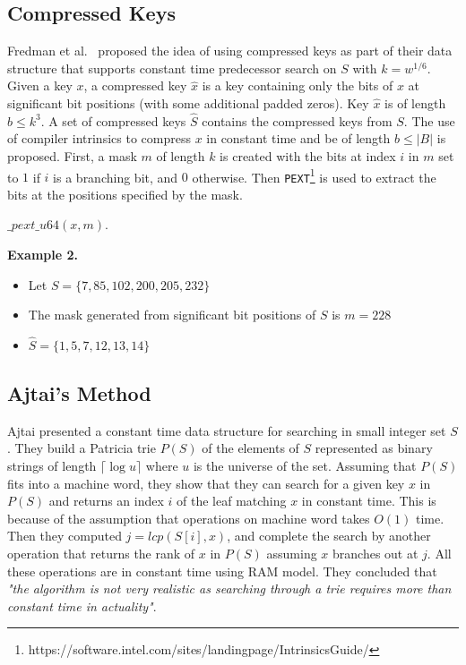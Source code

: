 \subsection{Compressed Keys} Fredman et al.~\cite{FREDMAN1993424} proposed the idea of using compressed keys as part of their data structure that supports constant time predecessor search on $S$ with $k = w^{1/6}$. Given a key $x$, a compressed key $\hat{x}$ is a key containing only the bits of $x$ at significant bit positions (with some additional padded zeros). Key $\hat{x}$ is of length $b \leq k^3$. A set of compressed keys $\hat{S}$ contains the compressed keys from $S$. The use of compiler intrinsics to compress $x$ in constant time and be of length $b \leq |B|$ is proposed. First, a mask $m$ of length $k$ is created with the bits at index $i$ in $m$ set to $1$ if $i$ is a branching bit, and $0$ otherwise. Then \texttt{PEXT}\footnote{https://software.intel.com/sites/landingpage/IntrinsicsGuide/} is used to extract the bits at the positions specified by the mask.\par
\begin{table}[ht]
    \centering
    \begin{minipage}[t]{1\textwidth}
        \centering
        \begin{algorithm}[H]
            \caption{Compress(x, m)}
            \begin{algorithmic}[1]
                \RETURN \textit{$\_pext\_u64(x, m)$}.
            \end{algorithmic}
        \end{algorithm}
    \end{minipage}%
\end{table}

\textbf{Example 2.}
\begin{itemize}
    \item Let $S = \{ 7, 85, 102, 200, 205, 232 \} $
    \item The mask generated from significant bit positions of $S$ is $m = 228$
    \item $\hat{S} = \{ 1, 5, 7, 12, 13, 14 \}$
\end{itemize}

\subsection{Ajtai's Method}
Ajtai \cite{AJTAI1984217} presented a constant time data structure for searching in small integer set $S$. They build a Patricia trie $P(S)$ of the elements of $S$ represented as binary strings of length $\lceil \log u \rceil$ where $u$ is the universe of the set. Assuming that $P(S)$ fits into a machine word, they show that they can search for a given key $x$ in $P(S)$ and returns an index $i$ of the leaf matching $x$ in constant time. This is because of the assumption that operations on machine word takes $O(1)$ time. Then they computed $j = lcp(S[i], x)$, and complete the search by another operation that returns the rank of $x$ in $P(S)$ assuming $x$ branches out at $j$. All these operations are in constant time using RAM model. They concluded that \textit{"the algorithm is not very realistic as searching through a trie requires more than constant time in actuality"}.


